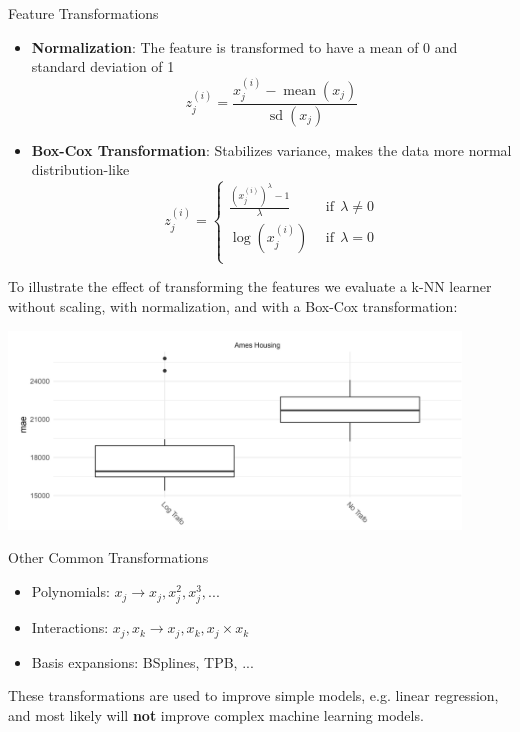 \begin{vbframe}{Feature Transformations}
  \begin{itemize}
    \item \textbf{Normalization}: The feature is transformed to have a mean of 0 and standard deviation of 1
          $$
            z_j^{(i)} = \frac{x_j^{(i)} - \operatorname{mean}(x_j)}{\operatorname{sd}(x_j)}
          $$
          
    \item \textbf{Box-Cox Transformation}: Stabilizes variance, makes the data more normal distribution-like
          $$
            z_j^{(i)} = \left\{\begin{array}{cc}
              \frac{\left(x_j^{(i)}\right)^\lambda - 1}{\lambda} & \ \ \text{if} \ \ \lambda \neq 0 \\
              \log(x_j^{(i)})                                    & \ \ \text{if} \ \ \lambda = 0    \\
            \end{array}\right.
          $$
  \end{itemize}
  \framebreak
  
  To illustrate the effect of transforming the features we evaluate a k-NN learner without scaling, with normalization, and with a Box-Cox transformation:
  
  \begin{center}
    \includegraphics[width=0.9\textwidth]{figure_man/feature01.png}
  \end{center}
  
\end{vbframe}

\begin{vbframe}{Other Common Transformations}
  \vspace{+1cm}
  \begin{itemize}
    \item Polynomials: $x_j \longrightarrow x_j, x_j^2, x_j^3, ...$
          
    \item Interactions: $x_j, x_k \longrightarrow x_j, x_k, x_j \times x_k$
          
    \item Basis expansions: BSplines, TPB, ...
  \end{itemize}
  \vspace{+.5cm}
  
  These transformations are used to improve simple models, e.g. linear regression, and most likely will \textbf{not} improve complex machine learning models.
\end{vbframe}

